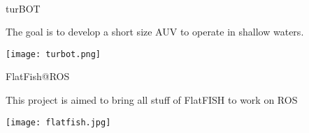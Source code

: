 
\begin{frame}[c]{} 
    \framesubtitle{}
    \transdissolve[duration=0.5]
   
    \begin{center}
    \end{center}

\end{frame}






\begin{frame}[t]{turBOT}

    The goal is to develop a short size AUV to operate in  shallow waters.
    \begin{center}

    \texttt{[image: turbot.png]}

    \end{center}
    
    
            
\end{frame}




\begin{frame}[t]{FlatFish@ROS}

    This project is aimed to bring all stuff of FlatFISH to work on ROS
    \begin{center}

    \texttt{[image: flatfish.jpg]}

    \end{center}
    
    
            
\end{frame}



